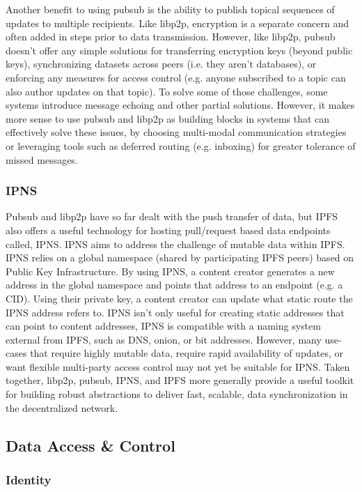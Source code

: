 \documentclass{comjnl}
\begin{document}
Another benefit to using pubsub is the ability to publish topical sequences of updates to multiple recipients. Like libp2p, encryption is a separate concern and often added in steps prior to data transmission. However, like libp2p, pubsub doesn’t offer any simple solutions for transferring encryption keys (beyond public keys), synchronizing datasets across peers (i.e. they aren’t databases), or enforcing any measures for access control (e.g. anyone subscribed to a topic can also author updates on that topic). To solve some of those challenges, some systems introduce message echoing and other partial solutions. However, it makes more sense to use pubsub and libp2p as building blocks in systems that can effectively solve these issues, by choosing multi-modal communication strategies or leveraging tools such as deferred routing (e.g. inboxing) for greater tolerance of missed messages.

\subsubsection{IPNS}

Pubsub and libp2p have so far dealt with the push transfer of data, but IPFS also offers a useful technology for hosting pull/request based data endpoints called, IPNS. IPNS aims to address the challenge of mutable data within IPFS. IPNS relies on a global namespace (shared by participating IPFS peers) based on Public Key Infrastructure. By using IPNS, a content creator generates a new address in the global namespace and points that address to an endpoint (e.g. a CID). Using their private key, a content creator can update what static route the IPNS address refers to. IPNS isn’t only useful for creating static addresses that can point to content addresses, IPNS is compatible with a naming system external from IPFS, such as DNS, onion, or bit addresses. However, many use-cases that require highly mutable data, require rapid availability of updates, or want flexible multi-party access control may not yet be suitable for IPNS. Taken together, libp2p, pubsub, IPNS, and IPFS more generally provide a useful toolkit for building robust abstractions to deliver fast, scalable, data synchronization in the decentralized network. 


\subsection{Data Access \& Control}

\subsubsection{Identity}
\end{document}
